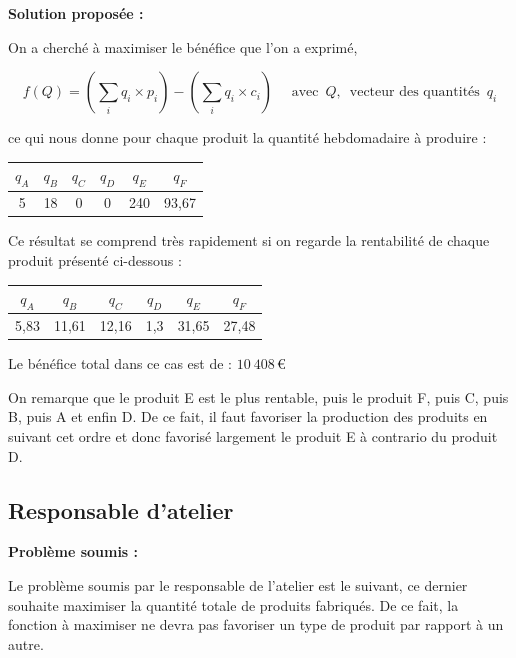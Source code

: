 \documentclass[paper=a4, fontsize=11pt]{scrartcl}
\numberwithin{equation}{section}		%
\numberwithin{figure}{section}			%
\numberwithin{table}{section}				%
\renewcommand{\bf}[1]{\textbf{#1}}
\begin{document}
\bf{Solution proposée :}

On a cherché à maximiser le bénéfice que l'on a exprimé, 

\[f(Q) = (\sum_i q_i \times p_i ) - (\sum_i q_i \times c_i) \quad \text{  avec } \, Q, \, \text{ vecteur des quantités } \, q_i \]

ce qui nous donne pour chaque produit la quantité hebdomadaire à produire :
\begin{center}
\begin{tabular}{cccccc}
\hline
$q_A$ & $q_B$ & $q_C$ & $q_D$ & $q_E$ & $q_F$ \\
\hline
5 & 18 & 0 & 0 & 240 & 93,67 \\
\hline
\end{tabular}
\end{center}

Ce résultat se comprend très rapidement si on regarde la rentabilité de chaque produit présenté ci-dessous :

\begin{center}
\begin{tabular}{cccccc}
\hline
$q_A$ & $q_B$ & $q_C$ & $q_D$ & $q_E$ & $q_F$ \\
\hline
5,83 & 11,61 & 12,16 & 1,3 & 31,65 & 27,48 \\
\hline
\end{tabular}
\end{center}

Le bénéfice total dans ce cas est de : $10\:408\,$€

On remarque que le produit E est le plus rentable, puis le produit F, puis C, puis B, puis A et enfin D.
De ce fait, il faut favoriser la production des produits en suivant cet ordre et donc favorisé largement le produit E à contrario du produit D.


\subsection{Responsable d'atelier}
\bf{Problème soumis :}

Le problème soumis par le responsable de l'atelier est le suivant, ce dernier souhaite maximiser la quantité totale de produits fabriqués. De ce fait, la fonction à maximiser ne devra pas favoriser un type de produit par rapport à un autre.\\
\end{document}
